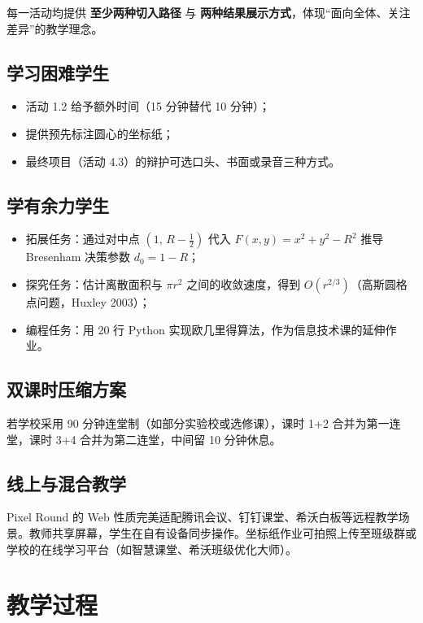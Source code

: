 \documentclass[12pt,a4paper]{scrartcl}
\newcommand{\acc}[1]{\textcolor{accent}{\textbf{#1}}}
\begin{document}
每一活动均提供 \acc{至少两种切入路径} 与 \acc{两种结果展示方式}，体现“面向全体、关注差异”的教学理念。

\subsection{学习困难学生}
\begin{itemize}[leftmargin=1.3em,itemsep=0.15em,topsep=0.3em]
  \item 活动 1.2 给予额外时间（15 分钟替代 10 分钟）；
  \item 提供预先标注圆心的坐标纸；
  \item 最终项目（活动 4.3）的辩护可选口头、书面或录音三种方式。
\end{itemize}

\subsection{学有余力学生}
\begin{itemize}[leftmargin=1.3em,itemsep=0.15em,topsep=0.3em]
  \item 拓展任务：通过对中点 $(1,\, R - \tfrac{1}{2})$ 代入 $F(x, y) = x^2 + y^2 - R^2$ 推导 Bresenham 决策参数 $d_0 = 1 - R$；
  \item 探究任务：估计离散面积与 $\pi r^2$ 之间的收敛速度，得到 $O(r^{2/3})$（高斯圆格点问题，Huxley 2003）；
  \item 编程任务：用 20 行 Python 实现欧几里得算法，作为信息技术课的延伸作业。
\end{itemize}

\subsection{双课时压缩方案}
若学校采用 90 分钟连堂制（如部分实验校或选修课），课时 1+2 合并为第一连堂，课时 3+4 合并为第二连堂，中间留 10 分钟休息。

\subsection{线上与混合教学}
Pixel Round 的 Web 性质完美适配腾讯会议、钉钉课堂、希沃白板等远程教学场景。教师共享屏幕，学生在自有设备同步操作。坐标纸作业可拍照上传至班级群或学校的在线学习平台（如智慧课堂、希沃班级优化大师）。

\section{教学过程}
\end{document}
